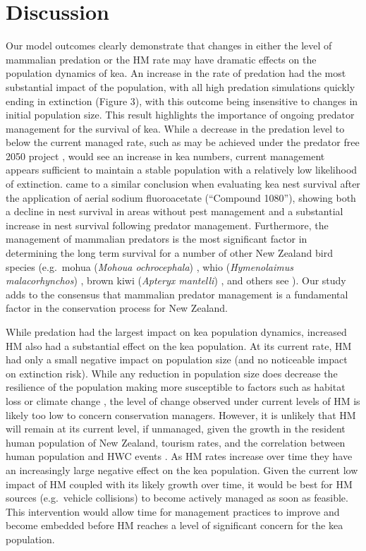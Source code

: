 \documentclass[11pt,]{article}
\begin{document}
\hypertarget{discussion}{%
\section{Discussion}\label{discussion}}

Our model outcomes clearly demonstrate that changes in either the level
of mammalian predation or the HM rate may have dramatic effects on the
population dynamics of kea. An increase in the rate of predation had the
most substantial impact of the population, with all high predation
simulations quickly ending in extinction (Figure 3), with this outcome
being insensitive to changes in initial population size. This result
highlights the importance of ongoing predator management for the
survival of kea. While a decrease in the predation level to below the
current managed rate, such as may be achieved under the predator free
2050 project \citep{Russell2015}, would see an increase in kea numbers,
current management appears sufficient to maintain a stable population
with a relatively low likelihood of extinction. \citet{kemp2018} came to
a similar conclusion when evaluating kea nest survival after the
application of aerial sodium fluoroacetate (``Compound 1080''), showing
both a decline in nest survival in areas without pest management and a
substantial increase in nest survival following predator management.
Furthermore, the management of mammalian predators is the most
significant factor in determining the long term survival for a number of
other New Zealand bird species (e.g.~mohua (\emph{Mohoua ochrocephala})
\citep{elliott1996}, whio (\emph{Hymenolaimus malacorhynchos})
\citep{simpkins2015}, brown kiwi (\emph{Apteryx mantelli})
\citep{Basse1999}, and others see \citet{Fea2020}). Our study adds to
the consensus that mammalian predator management is a fundamental factor
in the conservation process for New Zealand.

While predation had the largest impact on kea population dynamics,
increased HM also had a substantial effect on the kea population. At its
current rate, HM had only a small negative impact on population size
(and no noticeable impact on extinction risk). While any reduction in
population size does decrease the resilience of the population making
more susceptible to factors such as habitat loss or climate change
\citep{Keith2008}, the level of change observed under current levels of
HM is likely too low to concern conservation managers. However, it is
unlikely that HM will remain at its current level, if unmanaged, given
the growth in the resident human population of New Zealand, tourism
rates, and the correlation between human population and HWC events
\citep{Kretser2008}. As HM rates increase over time they have an
increasingly large negative effect on the kea population. Given the
current low impact of HM coupled with its likely growth over time, it
would be best for HM sources (e.g.~vehicle collisions) to become
actively managed as soon as feasible. This intervention would allow time
for management practices to improve and become embedded before HM
reaches a level of significant concern for the kea population.
\end{document}
